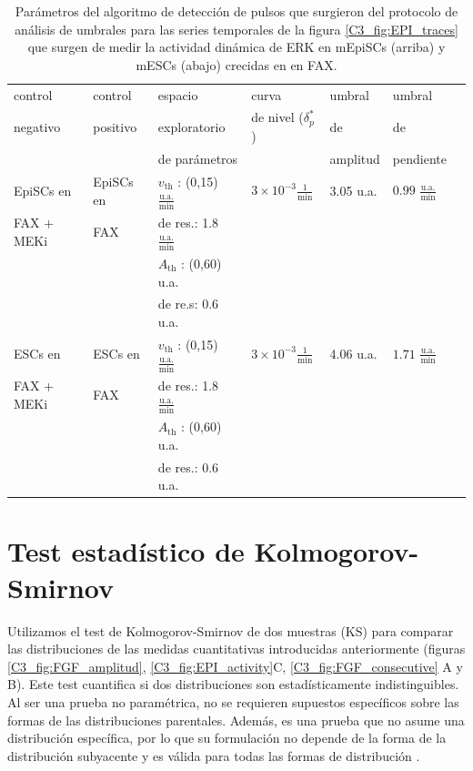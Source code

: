 \documentclass[./main.tex]{subfiles}
\begin{document}
\begin{subappendices}
\begin{table}[htbp]
\begin{adjustwidth}{-0.5in}{-0.5in}%
\centering
\begin{tabular}{|l|l|l|l|l|l|l|}
\hline
 control & control & espacio & curva & umbral & umbral \\
 negativo & positivo & exploratorio & de nivel ($\delta_p^*$) & de & de \\
 &  & de parámetros & & amplitud & pendiente \\
\hline \hline
EpiSCs en& EpiSCs en& $v_{\text{th}}$ : (0,15) $\frac{\text{u.a.}}{\text{min}}$ & $3 \times 10^{-3} \frac{1}{\text{min}}$ & 3.05 u.a. & $0.99$ $\frac{\text{u.a.}}{\text{min}}$ \\
 FAX + MEKi & FAX & de res.: 1.8 $\frac{\text{u.a.}}{\text{min}}$ & & & \\ 
  & & $A_{\text{th}}$ : (0,60) u.a. & & & \\
  & &  de re.s: 0.6 u.a. & & & \\
 \hline
 ESCs en& ESCs en& $v_{\text{th}}$ : (0,15) $\frac{\text{u.a.}}{\text{min}}$ & $3 \times 10^{-3} \frac{1}{\text{min}}$ & 4.06 u.a. & $1.71$ $\frac{\text{u.a.}}{\text{min}}$ \\
 FAX + MEKi & FAX & de res.: 1.8 $\frac{\text{u.a.}}{\text{min}}$ & & & \\
  & & $A_{\text{th}}$ : (0,60) u.a. & & & \\
  & &  de res.: 0.6 u.a. & & & \\
 \hline\end{tabular} 
 \end{adjustwidth}
\caption{Parámetros del algoritmo de detección de pulsos que surgieron del protocolo de análisis de umbrales para las series temporales de la figura \ref{C3_fig:EPI_traces} que surgen de medir la actividad dinámica de ERK en mEpiSCs (arriba) y mESCs (abajo) crecidas en en FAX.}
\label{C3_ap_tab:EPI_th}
\end{table}


\chapter{Test estadístico de Kolmogorov-Smirnov}
\label{C3_ap:FGF_KS_test}


Utilizamos el test de Kolmogorov-Smirnov de dos muestras (KS) para comparar las distribuciones de las medidas cuantitativas introducidas anteriormente (figuras \ref{C3_fig:FGF_amplitud}, \ref{C3_fig:EPI_activity}C, \ref{C3_fig:FGF_consecutive} A y B). Este test cuantifica si dos distribuciones son estadísticamente indistinguibles. Al ser una prueba no paramétrica, no se requieren supuestos específicos sobre las formas de las distribuciones parentales. Además, es una prueba que no asume una distribución específica, por lo que su formulación no depende de la forma de la distribución subyacente y es válida para todas las formas de distribución \cite{Frodesen1979}. 



\end{subappendices}
\end{document}
